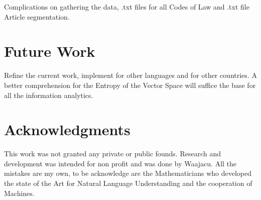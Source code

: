 \documentclass[a4paper,fleqn]{cas-sc}
\begin{document}
Complications on gathering the data, .txt files for all Codes of Law and .txt file Article segmentation. 

\section{Future Work}
Refine the current work, implement for other languages and for other countries. 
A better comprehension for the Entropy of the Vector Space will suffice the base for all the information analytics. 

\section{Acknowledgments}
This work was not granted any private or public founds. Research and development was intended for non profit and was done by Waajacu. 
All the mistakes are my own, to be acknowledge are the Mathematicians who developed the state of the Art for Natural Language Understanding 
and the cooperation of Machines. 



\end{document}
